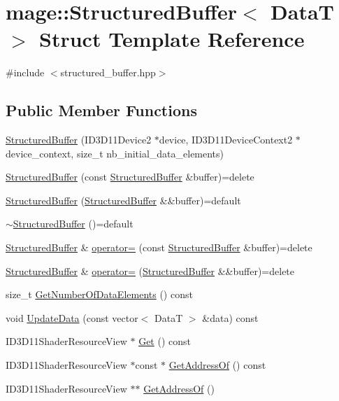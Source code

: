 \hypertarget{structmage_1_1_structured_buffer}{}\section{mage\+:\+:Structured\+Buffer$<$ DataT $>$ Struct Template Reference}
\label{structmage_1_1_structured_buffer}


{\ttfamily \#include $<$structured\+\_\+buffer.\+hpp$>$}

\subsection*{Public Member Functions}
\begin{DoxyCompactItemize}
\item 
\hyperlink{structmage_1_1_structured_buffer_a9ba747c0666b96c17e3711266ee74aa0}{Structured\+Buffer} (I\+D3\+D11\+Device2 $\ast$device, I\+D3\+D11\+Device\+Context2 $\ast$device\+\_\+context, size\+\_\+t nb\+\_\+initial\+\_\+data\+\_\+elements)
\item 
\hyperlink{structmage_1_1_structured_buffer_aa017416099a12305d0177094c768150e}{Structured\+Buffer} (const \hyperlink{structmage_1_1_structured_buffer}{Structured\+Buffer} \&buffer)=delete
\item 
\hyperlink{structmage_1_1_structured_buffer_a455bd930f39f5fdf6af4f453694997da}{Structured\+Buffer} (\hyperlink{structmage_1_1_structured_buffer}{Structured\+Buffer} \&\&buffer)=default
\item 
\hyperlink{structmage_1_1_structured_buffer_a02ab1d322e1aef0c608b85224b80dbcf}{$\sim$\+Structured\+Buffer} ()=default
\item 
\hyperlink{structmage_1_1_structured_buffer}{Structured\+Buffer} \& \hyperlink{structmage_1_1_structured_buffer_ac00255155ab1eb61244392adcf262d40}{operator=} (const \hyperlink{structmage_1_1_structured_buffer}{Structured\+Buffer} \&buffer)=delete
\item 
\hyperlink{structmage_1_1_structured_buffer}{Structured\+Buffer} \& \hyperlink{structmage_1_1_structured_buffer_a2647510e153d15b89f860e2a5c68e231}{operator=} (\hyperlink{structmage_1_1_structured_buffer}{Structured\+Buffer} \&\&buffer)=delete
\item 
size\+\_\+t \hyperlink{structmage_1_1_structured_buffer_ac37240379dcec90139ce727a915169fc}{Get\+Number\+Of\+Data\+Elements} () const
\item 
void \hyperlink{structmage_1_1_structured_buffer_aac2597ea7ee586207bf4918c3b4f9798}{Update\+Data} (const vector$<$ DataT $>$ \&data) const
\item 
I\+D3\+D11\+Shader\+Resource\+View $\ast$ \hyperlink{structmage_1_1_structured_buffer_ab16999f1d2b6bc9eceb628907ed5a8c0}{Get} () const
\item 
I\+D3\+D11\+Shader\+Resource\+View $\ast$const  $\ast$ \hyperlink{structmage_1_1_structured_buffer_a10dd9e717022b574d83fd29fa4f10537}{Get\+Address\+Of} () const
\item 
I\+D3\+D11\+Shader\+Resource\+View $\ast$$\ast$ \hyperlink{structmage_1_1_structured_buffer_a3ca7d25f7e04797ee2ae8acefff1cab8}{Get\+Address\+Of} ()
\end{DoxyCompactItemize}
